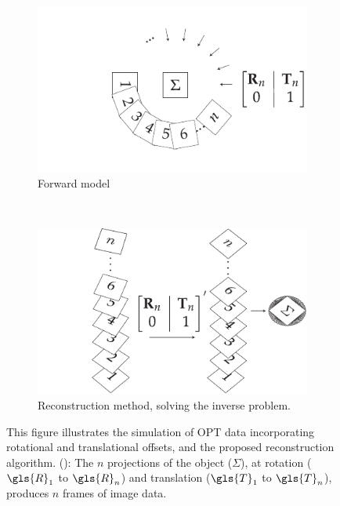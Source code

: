 \documentclass{osa-article}
\begin{document}
\begin{figure}
    \centering
    \begin{subfigure}[t]{\textwidth}
      \centering
      \includegraphics{./figures/flopt_algorithm_forward}
      \caption{Forward model}\label{fig:flopt_algorithm_forward}
    \end{subfigure}\\\vspace{\abovecaptionskip}
    \begin{subfigure}[t]{\textwidth}
      \centering
      \includegraphics{./figures/flopt_algorithm}
      \caption{Reconstruction method, solving the inverse problem.}\label{fig:flopt_algorithm_inverse}
    \end{subfigure}
    \caption[Simulation of \gls{OPT} data incorporating rotational and translational offsets, and the proposed reconstruction algorithm]{
    This figure illustrates the simulation of \gls{OPT} data incorporating rotational and translational offsets, and the proposed reconstruction algorithm.
    (): The \(n\) projections of the object (\(\Sigma \)), at rotation (\(\gls{R}_1\) to \(\gls{R}_n\)) and translation (\(\gls{T}_1\) to \(\gls{T}_n\)), produces \(n\) frames of image data.
}
\end{figure}
\end{document}
